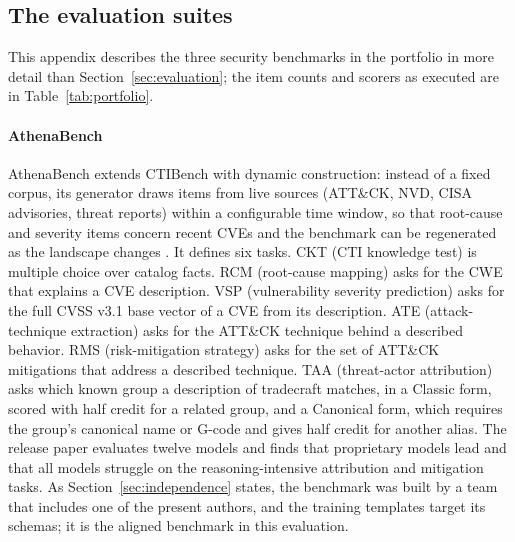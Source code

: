 \documentclass[twocolumn]{svjour3}
\begin{document}
\begin{appendix}
\section{The evaluation suites}\label{app:benchmarks}
This appendix describes the three security benchmarks in the portfolio in more detail than Section~\ref{sec:evaluation}; the item counts and scorers as executed are in Table~\ref{tab:portfolio}.

\paragraph{AthenaBench}
AthenaBench extends CTIBench \cite{alam2024ctibench} with dynamic construction: instead of a fixed corpus, its generator draws items from live sources (ATT\&CK, NVD, CISA advisories, threat reports) within a configurable time window, so that root-cause and severity items concern recent CVEs and the benchmark can be regenerated as the landscape changes \cite{alam2025athenabench}. It defines six tasks. CKT (CTI knowledge test) is multiple choice over catalog facts. RCM (root-cause mapping) asks for the CWE that explains a CVE description. VSP (vulnerability severity prediction) asks for the full CVSS v3.1 base vector of a CVE from its description. ATE (attack-technique extraction) asks for the ATT\&CK technique behind a described behavior. RMS (risk-mitigation strategy) asks for the set of ATT\&CK mitigations that address a described technique. TAA (threat-actor attribution) asks which known group a description of tradecraft matches, in a Classic form, scored with half credit for a related group, and a Canonical form, which requires the group's canonical name or G-code and gives half credit for another alias. The release paper evaluates twelve models and finds that proprietary models lead and that all models struggle on the reasoning-intensive attribution and mitigation tasks. As Section~\ref{sec:independence} states, the benchmark was built by a team that includes one of the present authors, and the training templates target its schemas; it is the aligned benchmark in this evaluation.


\end{appendix}
\end{document}
